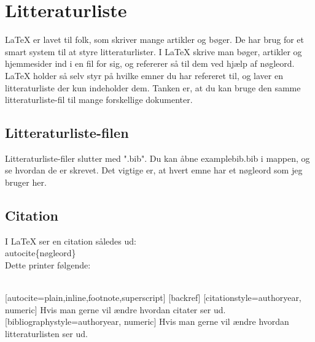 \section{Litteraturliste}

LaTeX er lavet til folk, som skriver mange artikler og bøger. De har brug for et smart system til at styre litteraturlister. I LaTeX skrive man bøger, artikler og hjemmesider ind i en fil for sig, og refererer så til dem ved hjælp af nøgleord. LaTeX holder så selv styr på hvilke emner du har refereret til, og laver en litteraturliste der kun indeholder dem. Tanken er, at du kan bruge den samme litteraturliste-fil til mange forskellige dokumenter.\\

\subsection{Litteraturliste-filen}
Litteraturliste-filer slutter med ".bib". Du kan åbne examplebib.bib i mappen, og se hvordan de er skrevet. Det vigtige er, at hvert emne har et nøgleord som jeg bruger her.

\subsection{Citation}
I LaTeX ser en citation således ud:\\

\bs autocite\{nøgleord\}\\

\noindent
Dette printer følgende:\\

\autocite{vase14}\\

\noindent




\nocite{john3}
[autocite=plain,inline,footnote,superscript] %
[backref] %
[citationstyle=authoryear, numeric] Hvis man gerne vil ændre hvordan citater ser ud.
[bibliographystyle=authoryear, numeric] Hvis man gerne vil ændre hvordan litteraturlisten ser ud.
